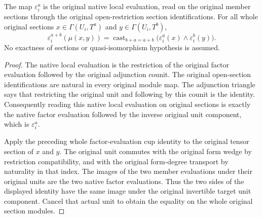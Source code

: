 \begin{theorem}
\label{thm:di-total-cup-original-native-local-evaluation}
\leanok
The map $\varepsilon_i^a$ is the original native local evaluation,
read on the original member sections through the original
open-restriction section identifications. For all whole original
sections $x\in\Gamma(U_i,T^a)$ and $y\in\Gamma(U_i,T^b)$,
\[
 \varepsilon_i^{a+b}(\mu(x,y))
 =\operatorname{cast}_{b+a=a+b}
   \bigl(\varepsilon_i^a(x)\wedge\varepsilon_i^b(y)\bigr).
\]
No exactness of sections or quasi-isomorphism hypothesis is assumed.
\end{theorem}
\begin{proof}
\leanok
The native local evaluation is the restriction of the original factor
evaluation followed by the original adjunction counit. The original
open-section identifications are natural in every original module
map. The adjunction triangle says that restricting the original unit
and following by this counit is the identity. Consequently reading
this native local evaluation on original sections is exactly the
native factor evaluation followed by the inverse original unit
component, which is $\varepsilon_i^a$.

Apply the preceding whole factor-evaluation cup identity to the
original tensor section of $x$ and $y$. The original unit commutes
with the original form wedge by restriction compatibility, and with
the original form-degree transport by naturality in that index.
The images of the two member evaluations under their original units
are the two native factor evaluations. Thus the two sides of the
displayed identity have the same image under the original invertible
target unit component. Cancel that actual unit to obtain the equality
on the whole original section modules.
\end{proof}

